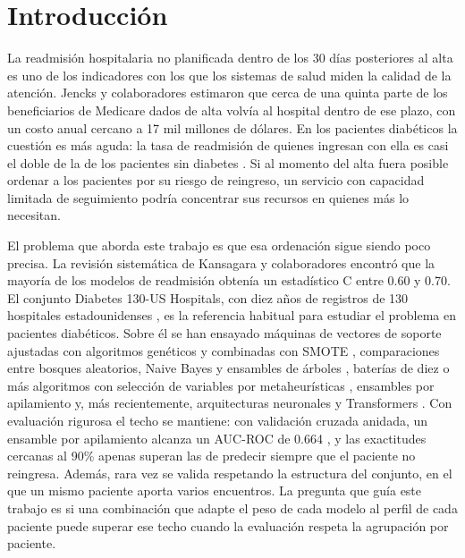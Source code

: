 \documentclass[pdflatex,sn-mathphys-num]{sn-jnl}
\begin{document}
\maketitle

\section{Introducción}\label{sec:intro}

La readmisión hospitalaria no planificada dentro de los 30 días posteriores al alta es uno de los indicadores con los que los sistemas de salud miden la calidad de la atención. Jencks y colaboradores \cite{bib_jencks} estimaron que cerca de una quinta parte de los beneficiarios de Medicare dados de alta volvía al hospital dentro de ese plazo, con un costo anual cercano a 17 mil millones de dólares. En los pacientes diabéticos la cuestión es más aguda: la tasa de readmisión de quienes ingresan con ella es casi el doble de la de los pacientes sin diabetes \cite{bib_liu_2024}. Si al momento del alta fuera posible ordenar a los pacientes por su riesgo de reingreso, un servicio con capacidad limitada de seguimiento podría concentrar sus recursos en quienes más lo necesitan.

El problema que aborda este trabajo es que esa ordenación sigue siendo poco precisa. La revisión sistemática de Kansagara y colaboradores \cite{bib_kansagara} encontró que la mayoría de los modelos de readmisión obtenía un estadístico C entre 0.60 y 0.70. El conjunto Diabetes 130-US Hospitals, con diez años de registros de 130 hospitales estadounidenses \cite{bib_strack}, es la referencia habitual para estudiar el problema en pacientes diabéticos. Sobre él se han ensayado máquinas de vectores de soporte ajustadas con algoritmos genéticos y combinadas con SMOTE \cite{bib_cui_2018}, comparaciones entre bosques aleatorios, Naive Bayes y ensambles de árboles \cite{bib_shang_2021, bib_neto_2021}, baterías de diez o más algoritmos con selección de variables por metaheurísticas \cite{bib_liu_2024}, ensambles por apilamiento \cite{bib_lu_2022, bib_salim_2026} y, más recientemente, arquitecturas neuronales y Transformers \cite{bib_ram_2023, bib_garcia_mosquera_2025}. Con evaluación rigurosa el techo se mantiene: con validación cruzada anidada, un ensamble por apilamiento alcanza un AUC-ROC de 0.664 \cite{bib_salim_2026}, y las exactitudes cercanas al 90\% \cite{bib_neto_2021} apenas superan las de predecir siempre que el paciente no reingresa. Además, rara vez se valida respetando la estructura del conjunto, en el que un mismo paciente aporta varios encuentros. La pregunta que guía este trabajo es si una combinación que adapte el peso de cada modelo al perfil de cada paciente puede superar ese techo cuando la evaluación respeta la agrupación por paciente.
\end{document}
